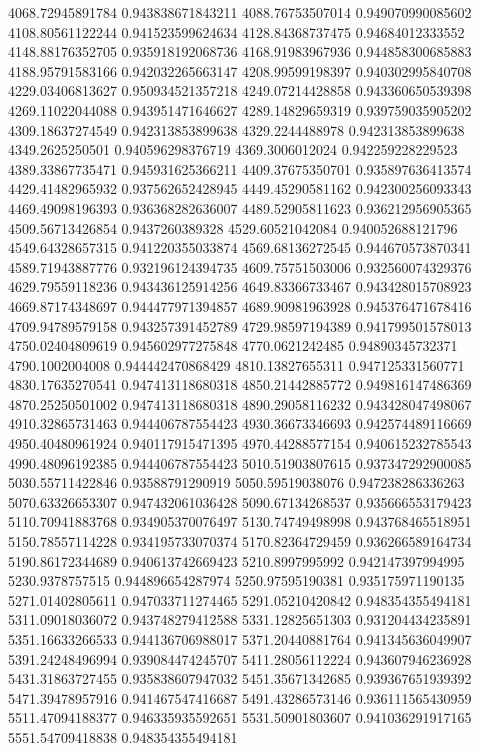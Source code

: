 {4068.72945891784 0.943838671843211
4088.76753507014 0.949070990085602
4108.80561122244 0.941523599624634
4128.84368737475 0.94684012333552
4148.88176352705 0.935918192068736
4168.91983967936 0.944858300685883
4188.95791583166 0.942032265663147
4208.99599198397 0.940302995840708
4229.03406813627 0.950934521357218
4249.07214428858 0.943360650539398
4269.11022044088 0.943951471646627
4289.14829659319 0.939759035905202
4309.18637274549 0.942313853899638
4329.2244488978 0.942313853899638
4349.2625250501 0.940596298376719
4369.3006012024 0.942259228229523
4389.33867735471 0.945931625366211
4409.37675350701 0.935897636413574
4429.41482965932 0.937562652428945
4449.45290581162 0.942300256093343
4469.49098196393 0.936368282636007
4489.52905811623 0.936212956905365
4509.56713426854 0.9437260389328
4529.60521042084 0.940052688121796
4549.64328657315 0.941220355033874
4569.68136272545 0.944670573870341
4589.71943887776 0.932196124394735
4609.75751503006 0.932560074329376
4629.79559118236 0.943436125914256
4649.83366733467 0.943428015708923
4669.87174348697 0.944477971394857
4689.90981963928 0.945376471678416
4709.94789579158 0.943257391452789
4729.98597194389 0.941799501578013
4750.02404809619 0.945602977275848
4770.0621242485 0.94890345732371
4790.1002004008 0.944442470868429
4810.13827655311 0.947125331560771
4830.17635270541 0.947413118680318
4850.21442885772 0.949816147486369
4870.25250501002 0.947413118680318
4890.29058116232 0.943428047498067
4910.32865731463 0.944406787554423
4930.36673346693 0.942574489116669
4950.40480961924 0.940117915471395
4970.44288577154 0.940615232785543
4990.48096192385 0.944406787554423
5010.51903807615 0.937347292900085
5030.55711422846 0.93588791290919
5050.59519038076 0.947238286336263
5070.63326653307 0.947432061036428
5090.67134268537 0.935666553179423
5110.70941883768 0.934905370076497
5130.74749498998 0.943768465518951
5150.78557114228 0.934195733070374
5170.82364729459 0.936266589164734
5190.86172344689 0.940613742669423
5210.8997995992 0.942147397994995
5230.9378757515 0.944896654287974
5250.97595190381 0.935175971190135
5271.01402805611 0.947033711274465
5291.05210420842 0.948354355494181
5311.09018036072 0.943748279412588
5331.12825651303 0.931204434235891
5351.16633266533 0.944136706988017
5371.20440881764 0.941345636049907
5391.24248496994 0.939084474245707
5411.28056112224 0.943607946236928
5431.31863727455 0.935838607947032
5451.35671342685 0.939367651939392
5471.39478957916 0.941467547416687
5491.43286573146 0.936111565430959
5511.47094188377 0.946335935592651
5531.50901803607 0.941036291917165
5551.54709418838 0.948354355494181
}
